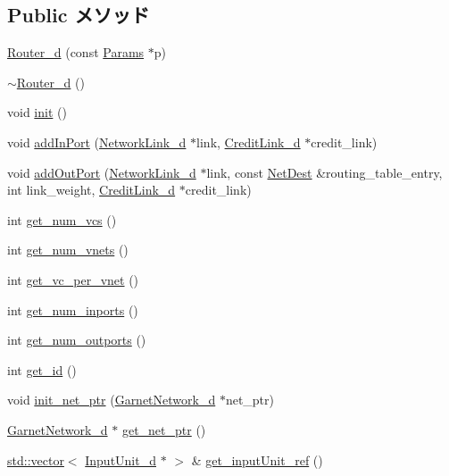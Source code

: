 \subsection*{Public メソッド}
\begin{DoxyCompactItemize}
\item 
\hyperlink{classRouter__d_a961ed977c934655d20a6d2ac92178e8c}{Router\_\-d} (const \hyperlink{classRouter__d_a0aa71fc14ebbcbd38c18c172bdbc48eb}{Params} $\ast$p)
\item 
\hyperlink{classRouter__d_a6a41fa2827bd5db9e5201b82733c0acb}{$\sim$Router\_\-d} ()
\item 
void \hyperlink{classRouter__d_a02fd73d861ef2e4aabb38c0c9ff82947}{init} ()
\item 
void \hyperlink{classRouter__d_a5c19293497c8ba70ccf1fb92c3ae503f}{addInPort} (\hyperlink{classNetworkLink__d}{NetworkLink\_\-d} $\ast$link, \hyperlink{classCreditLink__d}{CreditLink\_\-d} $\ast$credit\_\-link)
\item 
void \hyperlink{classRouter__d_a420e79fd219ef8937968b54800f4a710}{addOutPort} (\hyperlink{classNetworkLink__d}{NetworkLink\_\-d} $\ast$link, const \hyperlink{classNetDest}{NetDest} \&routing\_\-table\_\-entry, int link\_\-weight, \hyperlink{classCreditLink__d}{CreditLink\_\-d} $\ast$credit\_\-link)
\item 
int \hyperlink{classRouter__d_ac862c043f98ae554e518ca0b842beed1}{get\_\-num\_\-vcs} ()
\item 
int \hyperlink{classRouter__d_ab1fd1431cde7726e386b0ee92ae88174}{get\_\-num\_\-vnets} ()
\item 
int \hyperlink{classRouter__d_a048fe7d39416d6c11be1bd4ae1f70c13}{get\_\-vc\_\-per\_\-vnet} ()
\item 
int \hyperlink{classRouter__d_a4240599a90efd3e64dfb481ee674a3fd}{get\_\-num\_\-inports} ()
\item 
int \hyperlink{classRouter__d_a05323a01dc5aaf3fb3776cb50173f434}{get\_\-num\_\-outports} ()
\item 
int \hyperlink{classRouter__d_a1f0b8f09abd10342468ce33a1da15557}{get\_\-id} ()
\item 
void \hyperlink{classRouter__d_adb63d5adcd3ba8d6d0c6336d7b716243}{init\_\-net\_\-ptr} (\hyperlink{classGarnetNetwork__d}{GarnetNetwork\_\-d} $\ast$net\_\-ptr)
\item 
\hyperlink{classGarnetNetwork__d}{GarnetNetwork\_\-d} $\ast$ \hyperlink{classRouter__d_ab3cf04100769b695a462a6d08ef5f49d}{get\_\-net\_\-ptr} ()
\item 
\hyperlink{classstd_1_1vector}{std::vector}$<$ \hyperlink{classInputUnit__d}{InputUnit\_\-d} $\ast$ $>$ \& \hyperlink{classRouter__d_a5b233acca0e7233c784c1a4438daccba}{get\_\-inputUnit\_\-ref} ()

\end{DoxyCompactItemize}
